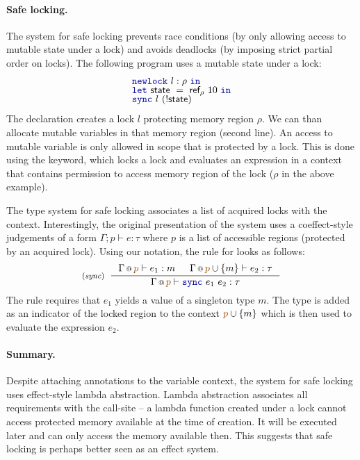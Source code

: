 \paragraph{Safe locking.}
The system for safe locking prevents race conditions (by only allowing access to mutable state 
under a lock) and avoids deadlocks (by imposing strict partial order on locks). The following 
program uses a mutable state under a lock:
%
\begin{equation*}
\begin{array}{l}
\kvd{newlock}~l:\rho~\kvd{in}\\[-0.25em]
\kvd{let}~\ident{state}~=~\ident{ref}_\rho~10~\kvd{in}\\[-0.25em]
\kvd{sync}~l~(!\ident{state})
\end{array}
\end{equation*}
%
The declaration  creates a lock $l$ protecting memory region $\rho$. We can than
allocate mutable variables in that memory region (second line). An access to mutable variable
is only allowed in scope that is protected by a lock. This is done using the  keyword,
which locks a lock and evaluates an expression in a context that contains permission to access
memory region of the lock ($\rho$ in the above example).

The type system for safe locking associates a list of acquired locks with the context. 
Interestingly, the original presentation of the system uses a coeffect-style judgements
of a form $\Gamma; p \vdash e : \tau$ where $p$ is a list of accessible regions (protected by
an acquired lock). Using our notation, the rule for  looks as follows:
%
\begin{equation*}
\tyrule{sync}
  { \coctx{\Gamma}{\aclrd{p}} \vdash e_1 : m& 
    \coctx{\Gamma}{\aclrd{p} \cup \{m\} } \vdash e_2 : \tau }
  { \coctx{\Gamma}{\aclrd{p}} \vdash \kvd{sync}~e_1~e_2 : \tau }
\end{equation*}
%
The rule requires that $e_1$ yields a value of a singleton type $m$. The type is added as an
indicator of the locked region to the context $\aclrd{p}\cup \{m\}$ which is then used to evaluate
the expression $e_2$.

\paragraph{Summary.}
Despite attaching annotations to the variable context, the system for safe locking uses 
effect-style lambda abstraction. Lambda abstraction associates all requirements with the 
call-site -- a lambda function created under a lock cannot access protected memory available at 
the time of creation. It will be executed later and can only access the memory available then.
This suggests that safe locking is perhaps better seen as an effect system. 


